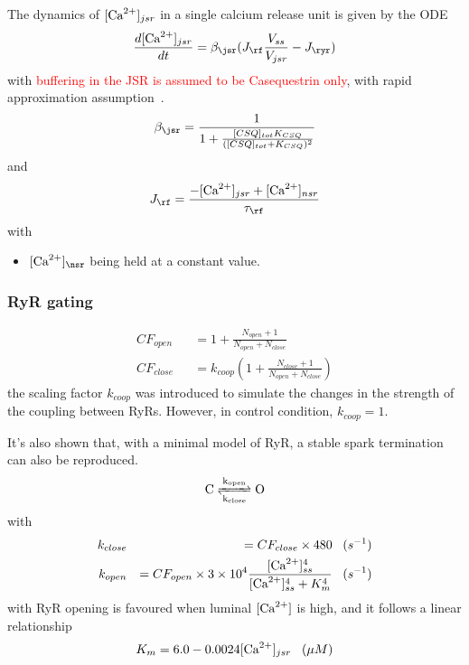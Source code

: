 The dynamics of $[{\text{Ca}^{2+}}]_{jsr}$ in a single calcium release unit is
given by the ODE
\begin{equation}
  \label{eq:953}
  \frac{d[\Ca]_{jsr}}{dt} = \beta_\jsr (J_\rf \frac{V_{ss}}{V_{jsr}} - J_\ryr )
\end{equation}
with
\textcolor{red}{ buffering in the JSR is assumed to be Casequestrin
  only}, with rapid approximation assumption~\citep{keizer1996rra}.
\begin{equation}
  \label{eq:956}
  \beta_\jsr = \frac{1}{1+\frac{[CSQ]_{tot}K_{CSQ}}{([CSQ]_{tot}+K_{CSQ})^2}}
\end{equation}
and
\begin{eqnarray}
  \label{eq:955}
  J_\rf = \frac{-[\Ca]_{jsr} + [\Ca]_{nsr}}{\tau_\rf}
\end{eqnarray}
with
\begin{itemize}
\item $[\Ca]_\nsr$ being held at a constant value. 
\end{itemize}


\subsubsection{RyR gating}
\label{sec:ryr-gating}


\begin{eqnarray}
  \label{eq:961}
  CF_{open} &&= 1 + \frac{N_{open}+ 1}{N_{open} + N_{close}} \\
  CF_{close} &&= k_{coop} \left( 1 + \frac{N_{close}+ 1}{N_{open} +
      N_{close}}  \right)
\end{eqnarray}
the scaling factor $k_{coop}$ was introduced to simulate the changes
in the strength of the coupling between RyRs. However, in control
condition, $k_{coop} = 1$.

It's also shown that, with a minimal model of RyR, a stable spark
termination can also be reproduced.
\begin{equation}
  \label{eq:958}
  \ce{C <=>[k_{open}][k_{close}] O}
\end{equation}
with
\begin{eqnarray}
  \label{eq:959}
  k_{close} &&= CF_{close} \times 480 \;\;\; (s^{-1}) \\
  k_{open} &&= CF_{open} \times 3 \times 10^4
  \frac{[{\text{Ca}^{2+}}]^4_{ss}}{[{\text{Ca}^{2+}}]^4_{ss} + K_m^4}  \;\;\; (s^{-1})
\end{eqnarray}
with RyR opening is favoured when luminal $[{\text{Ca}^{2+}}]$ is high, and it
follows a linear relationship
\begin{eqnarray}
  \label{eq:960}
  K_m = 6.0 - 0.0024 [{\text{Ca}^{2+}}]_{jsr} \;\;\; (\mu M)
\end{eqnarray}


